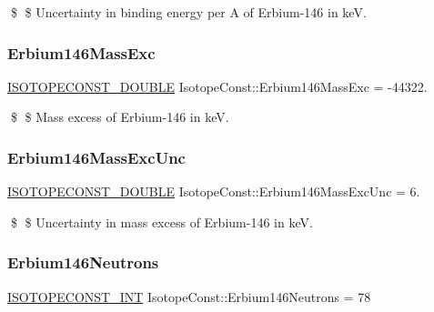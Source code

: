 \$ \$ Uncertainty in binding energy per A of Erbium-\/146 in keV. \mbox{\label{group___isotope_const-_erbium-_er146_ga19395ba6cf158b318c9fe477e0fb7719}} 
\subsubsection{\texorpdfstring{Erbium146\+Mass\+Exc}{Erbium146MassExc}}
{\footnotesize\ttfamily \mbox{\hyperlink{group___isotope_const-_macros_ga8f45a7272ce02c0b4c65c44636ed719a}{I\+S\+O\+T\+O\+P\+E\+C\+O\+N\+S\+T\+\_\+\+D\+O\+U\+B\+LE}} Isotope\+Const\+::\+Erbium146\+Mass\+Exc = -\/44322.}

\$ \$ Mass excess of Erbium-\/146 in keV. \mbox{\label{group___isotope_const-_erbium-_er146_ga5aaeea33fd3c2cd62d40d9f5fc0728cb}} 
\subsubsection{\texorpdfstring{Erbium146\+Mass\+Exc\+Unc}{Erbium146MassExcUnc}}
{\footnotesize\ttfamily \mbox{\hyperlink{group___isotope_const-_macros_ga8f45a7272ce02c0b4c65c44636ed719a}{I\+S\+O\+T\+O\+P\+E\+C\+O\+N\+S\+T\+\_\+\+D\+O\+U\+B\+LE}} Isotope\+Const\+::\+Erbium146\+Mass\+Exc\+Unc = 6.}

\$ \$ Uncertainty in mass excess of Erbium-\/146 in keV. \mbox{\label{group___isotope_const-_erbium-_er146_ga8fb476ba7a489a03ee4f20b9a8fdb7d4}} 
\subsubsection{\texorpdfstring{Erbium146\+Neutrons}{Erbium146Neutrons}}
{\footnotesize\ttfamily \mbox{\hyperlink{group___isotope_const-_macros_ga5f18360b3e99483a35c32d789e62621c}{I\+S\+O\+T\+O\+P\+E\+C\+O\+N\+S\+T\+\_\+\+I\+NT}} Isotope\+Const\+::\+Erbium146\+Neutrons = 78}

